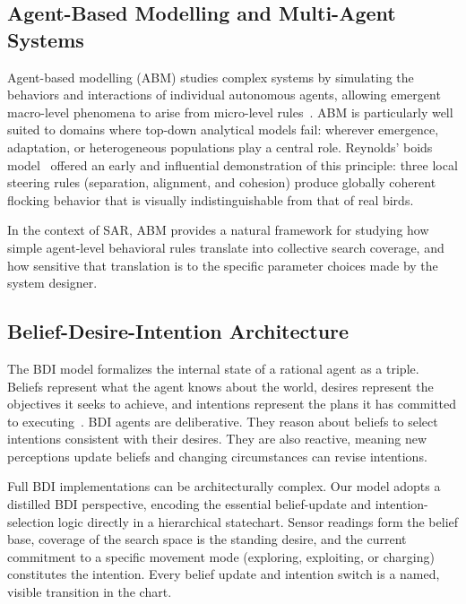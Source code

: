 \documentclass[10pt,a4paper,twocolumn]{article}
\begin{document}
\subsection{Agent-Based Modelling and Multi-Agent Systems}

Agent-based modelling (ABM) studies complex systems by simulating the behaviors and interactions of individual autonomous agents, allowing emergent macro-level phenomena to arise from micro-level rules~\citep{ar:Macal2016,ar:GallegatiEtAl2024}. ABM is particularly well suited to domains where top-down analytical models fail: wherever emergence, adaptation, or heterogeneous populations play a central role. Reynolds' boids model~\citep{inpr:Reynolds1987} offered an early and influential demonstration of this principle: three local steering rules (separation, alignment, and cohesion) produce globally coherent flocking behavior that is visually indistinguishable from that of real birds.

In the context of SAR, ABM provides a natural framework for studying how simple agent-level behavioral rules translate into collective search coverage, and how sensitive that translation is to the specific parameter choices made by the system designer.

\subsection{Belief-Desire-Intention Architecture}

The BDI model formalizes the internal state of a rational agent as a triple. Beliefs represent what the agent knows about the world, desires represent the objectives it seeks to achieve, and intentions represent the plans it has committed to executing~\citep{bk:Wooldridge2009}. BDI agents are deliberative. They reason about beliefs to select intentions consistent with their desires. They are also reactive, meaning new perceptions update beliefs and changing circumstances can revise intentions.

Full BDI implementations can be architecturally complex. Our model adopts a distilled BDI perspective, encoding the essential belief-update and intention-selection logic directly in a hierarchical statechart. Sensor readings form the belief base, coverage of the search space is the standing desire, and the current commitment to a specific movement mode (exploring, exploiting, or charging) constitutes the intention. Every belief update and intention switch is a named, visible transition in the chart.
\end{document}
